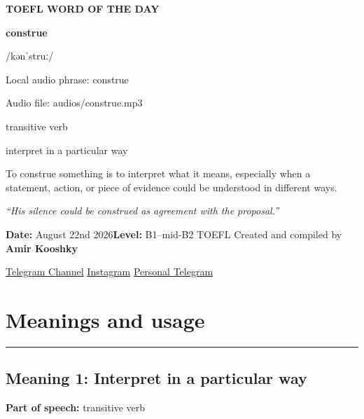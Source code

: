 \documentclass[11pt]{article}
\newcommand{\sectionrule}{\par\vspace{-0.5em}\noindent\textcolor{Accent}{\rule{\linewidth}{0.6pt}}\par}
\begin{document}
\begin{center}
{\sffamily\bfseries\color{Accent} TOEFL WORD OF THE DAY\par}
\vspace{8mm}
{\fontsize{42}{48}\selectfont\bfseries construe\par}
\vspace{2mm}
{\Large\sffamily\color{Accent} /kənˈstruː/\par}
\vspace{2mm}
{\small\sffamily Local audio phrase: construe\par}
{\small\sffamily Audio file: audios/construe.mp3\par}
\vspace{2mm}
{\large\sffamily\color{Muted} transitive verb\par}
\vspace{5mm}
{\sffamily interpret in a particular way\par}
\vspace{6mm}
{\large To construe something is to interpret what it means, especially when a statement, action, or piece of evidence could be understood in different ways.\par}
\vspace{6mm}
\begin{minipage}{0.84\textwidth}
\itshape “His silence could be construed as agreement with the proposal.”
\end{minipage}\par
\vspace{10mm}
\textbf{Date:} August 22nd 2026\quad\textbullet\quad \textbf{Level:} B1--mid-B2 TOEFL
\vfill
Created and compiled by \textbf{Amir Kooshky}\par
\vspace{2mm}
\href{https://t.me/KooshkyTOEFL}{Telegram Channel}\quad\textbullet\quad
\href{https://www.instagram.com/kooshkytoefl}{Instagram}\quad\textbullet\quad
\href{https://t.me/KooshkyTOEFL\_pv}{Personal Telegram}
\end{center}
\newpage
\tableofcontents
\newpage

\section{Meanings and usage}
\sectionrule
\subsection{Meaning 1: Interpret in a particular way}
\textbf{Part of speech:} transitive verb
\end{document}
